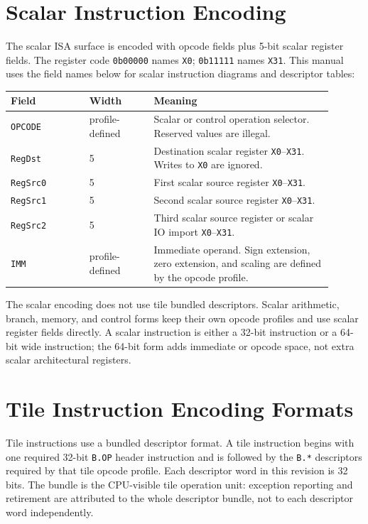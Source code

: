 \section{Scalar Instruction Encoding}
\label{sec:scalar_instruction_encoding}
The scalar ISA surface is encoded with opcode fields plus 5-bit scalar register fields. The register code \texttt{0b00000} names \texttt{X0}; \texttt{0b11111} names \texttt{X31}. This manual uses the field names below for scalar instruction diagrams and descriptor tables:

\begin{longtable}{@{}L{0.22\linewidth}L{0.18\linewidth}L{0.50\linewidth}@{}}
\toprule
Field & Width & Meaning \\
\midrule
\texttt{OPCODE} & profile-defined & Scalar or control operation selector. Reserved values are illegal. \\
\texttt{RegDst} & 5 & Destination scalar register \texttt{X0}--\texttt{X31}. Writes to \texttt{X0} are ignored. \\
\texttt{RegSrc0} & 5 & First scalar source register \texttt{X0}--\texttt{X31}. \\
\texttt{RegSrc1} & 5 & Second scalar source register \texttt{X0}--\texttt{X31}. \\
\texttt{RegSrc2} & 5 & Third scalar source register or scalar IO import \texttt{X0}--\texttt{X31}. \\
\texttt{IMM} & profile-defined & Immediate operand. Sign extension, zero extension, and scaling are defined by the opcode profile. \\
\bottomrule
\end{longtable}

The scalar encoding does not use tile bundled descriptors. Scalar arithmetic, branch, memory, and control forms keep their own opcode profiles and use scalar register fields directly. A scalar instruction is either a 32-bit instruction or a 64-bit wide instruction; the 64-bit form adds immediate or opcode space, not extra scalar architectural registers.

\section{Tile Instruction Encoding Formats}
\label{sec:tile_instruction_encoding_formats}
Tile instructions use a bundled descriptor format. A tile instruction begins with one required 32-bit \texttt{B.OP} header instruction and is followed by the \texttt{B.*} descriptors required by that tile opcode profile. Each descriptor word in this revision is 32 bits. The bundle is the CPU-visible tile operation unit: exception reporting and retirement are attributed to the whole descriptor bundle, not to each descriptor word independently.

